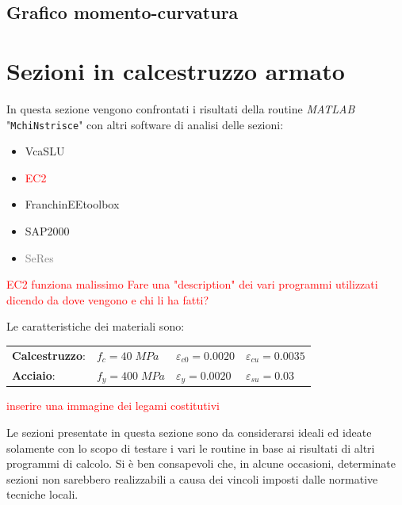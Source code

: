 \documentclass[10pt]{article}
\begin{document}
\subsection{Grafico momento-curvatura}













\newpage

\section{Sezioni in calcestruzzo armato}

In questa sezione vengono confrontati i risultati della routine \textit{MATLAB} "\texttt{MchiNstrisce}" con altri software di analisi delle sezioni:
\begin{itemize}[noitemsep]
\item VcaSLU
\item \textcolor{red}{EC2}
\item FranchinEEtoolbox
\item SAP2000
\item \textcolor{gray}{SeRes}
\end{itemize}
\textcolor{red}{EC2 funziona malissimo}
\textcolor{red}{Fare una "description" dei vari programmi utilizzati dicendo da dove vengono e chi li ha fatti?}

\bigskip

Le caratteristiche dei materiali sono:

\begin{table}[H]
\begin{tabular}{llll}
\textbf{Calcestruzzo}: & $f_c = 40 \; MPa$  & $\varepsilon_{c0} = 0.0020$ & $\varepsilon_{cu} = 0.0035$ \\
\textbf{Acciaio}:      & $f_y = 400 \; MPa$ & $\varepsilon_{y} = 0.0020$  & $\varepsilon_{su} = 0.03$\\
\end{tabular}
\end{table}

\textcolor{red}{inserire una immagine dei legami costitutivi}

Le sezioni presentate in questa sezione sono da considerarsi ideali ed ideate solamente con lo scopo di testare i vari le routine in base ai risultati di altri programmi di calcolo. Si è ben consapevoli che, in alcune occasioni, determinate sezioni non sarebbero realizzabili a causa dei vincoli imposti dalle normative tecniche locali.
\end{document}
